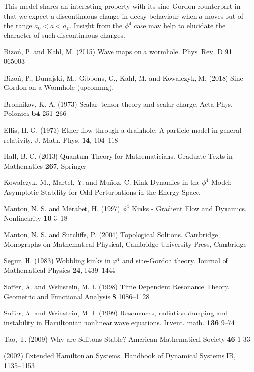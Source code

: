 This model shares an interesting property with its sine--Gordon counterpart in that we expect a discontinuous change in decay behaviour when $a$ moves out of the range $a_0<a<a_1$. Insight from the $\phi^4$ case may help to elucidate the character of such discontinuous changes.

 


\begin{thebibliography}{}

 Bizo\'n, P. and Kahl, M. (2015)
Wave maps on a wormhole. Phys. Rev. D {\bf 91} 065003

 Bizo\'n, P., Dunajski, M., Gibbons, G., Kahl, M. and Kowalczyk, M. (2018) Sine-Gordon on a Wormhole (upcoming).

 Bronnikov, K. A. (1973)
Scalar--tensor theory and scalar charge. Acta Phys. Polonica {\bf b4} 251--266

 Ellis, H. G. (1973)
Ether flow through a drainhole: A particle model in general relativity. J. Math. Phys. {\bf 14}, 104--118

 Hall, B. C. (2013)
Quantum Theory for Mathematicians. Graduate Texts in Mathematics {\bf 267}, Springer

 Kowalczyk, M., Martel, Y. and Mu\~noz, C.
Kink Dynamics in the $\phi^4$ Model: Asymptotic Stability for Odd Perturbations in the Energy Space. 

 Manton, N. S. and Merabet, H. (1997)
$\phi^4$ Kinks - Gradient Flow and Dynamics. Nonlinearity {\bf 10} 3--18

 Manton, N. S. and Sutcliffe, P. (2004)
Topological Solitons. Cambridge Monographs on Mathematical Physical, Cambridge University Press, Cambridge

 Segur, H. (1983)
Wobbling kinks in $\varphi^4$ and sine-Gordon theory. Journal of Mathematical Physics {\bf 24}, 1439--1444

 Soffer, A. and Weinstein, M. I. (1998)
Time Dependent Resonance Theory. Geometric and Functional Analysis {\bf 8} 1086--1128

 Soffer, A. and Weinstein, M. I. (1999)
Resonances, radiation damping and instability in Hamiltonian nonlinear wave equations. Invent. math. {\bf 136} 9--74

 Tao, T. (2009)
Why are Solitons Stable? American Mathematical Society {\bf 46} 1-33

 (2002)
Extended Hamiltonian Systems. Handbook of Dynamical Systems IB, 1135--1153


\end{thebibliography}
